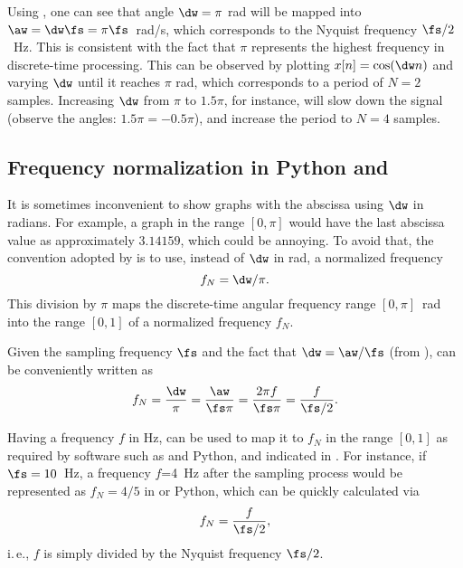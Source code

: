 Using , one can see that angle $\dw = \pi$ rad will be mapped into $\aw = \dw \fs = \pi \fs$~rad/s, which corresponds to the Nyquist frequency $\fs/2$~Hz.
This is consistent with the fact that $\pi$ represents the highest frequency in discrete-time processing. This can be observed by plotting $x[n]=\cos( \dw n)$ and varying $\dw$ until it reaches $\pi$ rad, which corresponds to a period of $N=2$ samples. Increasing $\dw$ from $\pi$ to $1.5 \pi$, for instance, will slow down the signal (observe the angles: $1.5 \pi = -0.5 \pi$), and increase the period to $N=4$ samples.

\subsection{Frequency normalization in Python and {\matlab}}
\label{sec:frequency_normalization}

It is sometimes inconvenient to show graphs with the abscissa using $\dw$ in radians. For example, a graph in the range $[0, \pi]$ would have the last abscissa value as approximately $3.14159$, which could be annoying. To avoid that, the convention adopted by {\matlab} is to use, instead of $\dw$ in rad, a normalized frequency 
\begin{equation}
f_N=\dw / \pi.
\label{eq:matlabNormalizedFrequency}
\end{equation}
This division by $\pi$ maps the discrete-time angular frequency range $[0, \pi]$~rad into the range $[0, 1]$ of a normalized frequency $f_N$.

Given the sampling frequency $\fs$ and the fact that $\dw=\aw/\fs$ (from ),  can be conveniently written as
\begin{equation}
f_N=  \frac{\dw}{\pi} = \frac{\aw}{\fs \pi} = \frac{2 \pi f}{ \fs \pi} = \frac{f}{\fs/2}.
\label{eq:matlabNormFreq2}
\end{equation}

Having a frequency $f$ in Hz,  can be used to map it to $f_N$ in the range $[0, 1]$
as required by software such as {\matlab} and Python, and indicated in . 
For instance, if $\fs=10$~Hz, a frequency $f$=4~Hz after the sampling process would be represented as $f_N=4/5$ in {\matlab} or Python,
which can be quickly calculated via
\begin{equation}
f_N= \frac{f}{\fs/2},
\label{eq:inHzMatlabNormalizedFrequency}
\end{equation}
i.\,e., $f$ is simply divided by the Nyquist frequency $\fs/2$.


